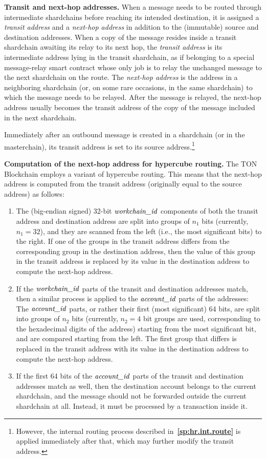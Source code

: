 \documentclass[12pt,oneside]{article}
\def\makepoint#1{\medbreak\noindent{\bf #1.\ }}
\def\nxsubpoint{\refstepcounter{subsubsection}%
  \smallbreak\makepoint{\thesubsubsection}}
\def\refpoint#1{{\rm\textbf{\ref{#1}}}}
\let\ptref=\refpoint
\def\emb#1{\textbf{#1.}}
\let\vr=\textit
\def\workchainid{\vr{workchain\_id\/}}
\def\accountid{\vr{account\_id\/}}
\begin{document}
\nxsubpoint\emb{Transit and next-hop addresses}
When a message needs to be routed through intermediate shardchains before reaching its intended destination, it is assigned a {\em transit address\/} and a {\em next-hop address\/} in addition to the (immutable) source and destination addresses. When a copy of the message resides inside a transit shardchain awaiting its relay to its next hop, the {\em transit address\/} is its intermediate address lying in the transit shardchain, as if belonging to a special message-relay smart contract whose only job is to relay the unchanged message to the next shardchain on the route. The {\em next-hop address\/} is the address in a neighboring shardchain (or, on some rare occasions, in the same shardchain) to which the message needs to be relayed. After the message is relayed, the next-hop address usually becomes the transit address of the copy of the message included in the next shardchain.

Immediately after an outbound message is created in a shardchain (or in the masterchain), its transit address is set to its source address.\footnote{However, the internal routing process described in~\ptref{sp:hr.int.route} is applied immediately after that, which may further modify the transit address.}

\nxsubpoint\label{sp:hr.next.hop}\emb{Computation of the next-hop address for hypercube routing}
The TON Blockchain employs a variant of hypercube routing. This means that the next-hop address is computed from the transit address (originally equal to the source address) as follows:

\begin{enumerate}
\item The (big-endian signed) 32-bit $\workchainid$ components of both the transit address and destination address are split into groups of $n_1$ bits (currently, $n_1=32$), and they are scanned from the left (i.e., the most significant bits) to the right. If one of the groups in the transit address differs from the corresponding group in the destination address, then the value of this group in the transit address is replaced by its value in the destination address to compute the next-hop address.
\item If the $\workchainid$ parts of the transit and destination addresses match, then a similar process is applied to the $\accountid$ parts of the addresses: The $\accountid$ parts, or rather their first (most significant) 64 bits, are split into groups of $n_2$ bits (currently, $n_2=4$ bit groups are used, corresponding to the hexadecimal digits of the address) starting from the most significant bit, and are compared starting from the left. The first group that differs is replaced in the transit address with its value in the destination address to compute the next-hop address.
\item If the first 64 bits of the $\accountid$ parts of the transit and destination addresses match as well, then the destination account belongs to the current shardchain, and the message should not be forwarded outside the current shardchain at all. Instead, it must be processed by a transaction inside it.
\end{enumerate}
\end{document}
